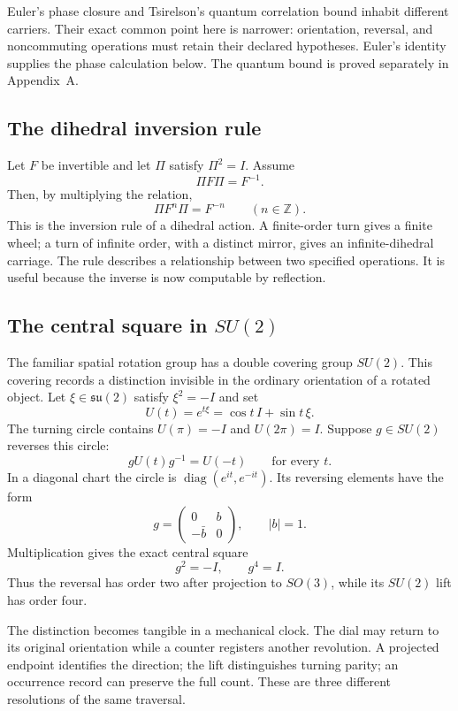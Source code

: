 \documentclass[10pt]{article}
\begin{document}
Euler's phase closure and Tsirelson's quantum correlation bound inhabit
different carriers. Their exact common point here is narrower:
orientation, reversal, and noncommuting operations must retain their
declared hypotheses. Euler's identity supplies the phase calculation
below. The quantum bound is proved separately in Appendix~A.

\subsection*{The dihedral inversion rule}
Let $F$ be invertible and let $\Pi$ satisfy $\Pi^2=I$. Assume
\begin{equation}
\boxed{\Pi F\Pi=F^{-1}.}\label{eq:dihedral}
\end{equation}
Then, by multiplying the relation,
\[
\Pi F^n\Pi=F^{-n}\qquad(n\in\mathbb Z).
\]
This is the inversion rule of a dihedral action. A finite-order
turn gives a finite wheel; a turn of infinite order, with a distinct
mirror, gives an infinite-dihedral carriage. The rule describes a
relationship between two specified operations. It is useful because
the inverse is now computable by reflection.

\subsection*{The central square in $SU(2)$}
The familiar spatial rotation group has a double covering group
$SU(2)$. This covering records a distinction invisible in the
ordinary orientation of a rotated object. Let $\xi\in\mathfrak{su}(2)$
satisfy $\xi^2=-I$ and set
\[
U(t)=e^{t\xi}=\cos t\,I+\sin t\,\xi.
\]
The turning circle contains $U(\pi)=-I$ and $U(2\pi)=I$.
Suppose $g\in SU(2)$ reverses this circle:
\[
gU(t)g^{-1}=U(-t)\qquad\text{for every }t.
\]
In a diagonal chart the circle is
$\operatorname{diag}(e^{it},e^{-it})$.
Its reversing elements have the form
\[
g=\begin{pmatrix}0&b\\-\bar b&0\end{pmatrix},
\qquad |b|=1.
\]
Multiplication gives the exact central square
\begin{equation}
\boxed{g^2=-I,\qquad g^4=I.}
\end{equation}
Thus the reversal has order two after projection to $SO(3)$,
while its $SU(2)$ lift has order four.

The distinction becomes tangible in a mechanical clock.
The dial may return to its original orientation while a counter
registers another revolution. A projected endpoint identifies the
direction; the lift distinguishes turning parity; an occurrence
record can preserve the full count. These are three different
resolutions of the same traversal.
\end{document}
